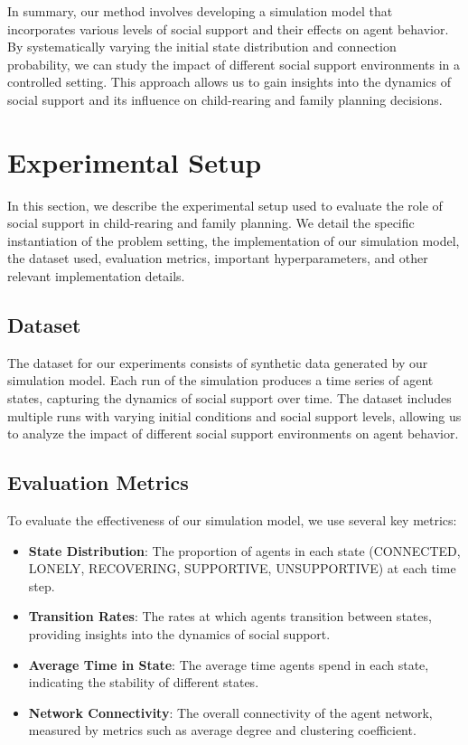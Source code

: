 \documentclass{article} %
\begin{document}
In summary, our method involves developing a simulation model that incorporates various levels of social support and their effects on agent behavior. By systematically varying the initial state distribution and connection probability, we can study the impact of different social support environments in a controlled setting. This approach allows us to gain insights into the dynamics of social support and its influence on child-rearing and family planning decisions.

\section{Experimental Setup}
\label{sec:experimental}

In this section, we describe the experimental setup used to evaluate the role of social support in child-rearing and family planning. We detail the specific instantiation of the problem setting, the implementation of our simulation model, the dataset used, evaluation metrics, important hyperparameters, and other relevant implementation details.

\subsection{Dataset}
\label{sec:dataset}
The dataset for our experiments consists of synthetic data generated by our simulation model. Each run of the simulation produces a time series of agent states, capturing the dynamics of social support over time. The dataset includes multiple runs with varying initial conditions and social support levels, allowing us to analyze the impact of different social support environments on agent behavior.

\subsection{Evaluation Metrics}
\label{sec:evaluation_metrics}
To evaluate the effectiveness of our simulation model, we use several key metrics:
\begin{itemize}
    \item \textbf{State Distribution}: The proportion of agents in each state (CONNECTED, LONELY, RECOVERING, SUPPORTIVE, UNSUPPORTIVE) at each time step.
    \item \textbf{Transition Rates}: The rates at which agents transition between states, providing insights into the dynamics of social support.
    \item \textbf{Average Time in State}: The average time agents spend in each state, indicating the stability of different states.
    \item \textbf{Network Connectivity}: The overall connectivity of the agent network, measured by metrics such as average degree and clustering coefficient.
\end{itemize}
\end{document}
